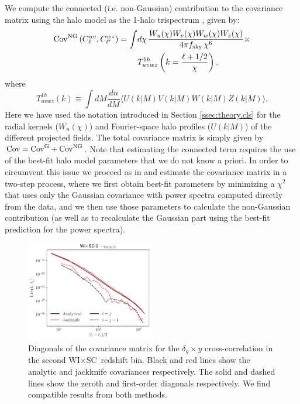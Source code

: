 \documentclass[useAMS,usenatbib]{mn2e}
\newcommand{\wisc}{WI$\times$SC}
\begin{document}
    We compute the connected (i.e. non-Gaussian) contribution to the covariance matrix using the halo model as the 1-halo trispectrum \citep{2002MNRAS.336.1256K}, given by:
    \begin{align}\nonumber
      {\rm Cov}^{\rm NG}\left(C^{uv}_\ell,C^{wz}_{\ell'}\right)=\int &d\chi\,\frac{W_u(\chi)W_v(\chi)W_w(\chi)W_z(\chi)}{4\pi f_{\rm sky}\,\chi^6}\times\\\label{eq:cov_ng}
      &T^{1h}_{uvwz}\left(k=\frac{\ell+1/2}{\chi}\right),
    \end{align}
    where
    \begin{equation}\nonumber
      T^{1h}_{uvwz}(k)\equiv\int dM\frac{dn}{dM}\langle U(k|M) V(k|M) W(k|M) Z(k|M)\rangle.
    \end{equation}
    Here we have used the notation introduced in Section \ref{ssec:theory.cls} for the radial kernels ($W_u(\chi)$) and Fourier-space halo profiles ($U(k|M)$) of the different projected fields. The total covariance matrix is simply given by ${\rm Cov}={\rm Cov}^{\rm G}+{\rm Cov}^{\rm NG}$. Note that estimating the connected term requires the use of the best-fit halo model parameters that we do not know a priori. In order to circumvent this issue we proceed as in \cite{2018MNRAS.473.4318A} and estimate the covariance matrix in a two-step process, where we first obtain best-fit parameters by minimizing a $\chi^2$ that uses only the Gaussian covariance with power spectra computed directly from the data, and we then use those parameters to calculate the non-Gaussian contribution (as well as to recalculate the Gaussian part using the best-fit prediction for the power spectra).
    \begin{figure}
      \centering
      \includegraphics[width=0.5\textwidth]{cov_diag_wisc2.pdf}
      \caption{Diagonals of the covariance matrix for the $\delta_g\times y$ cross-correlation in the second \wisc~redshift bin. Black and red lines show the analytic and jackknife covariances respectively. The solid and dashed lines show the zeroth and first-order diagonals respectively. We find compatible results from both methods.}
      \label{fig:covdiag}
    \end{figure}
\end{document}
